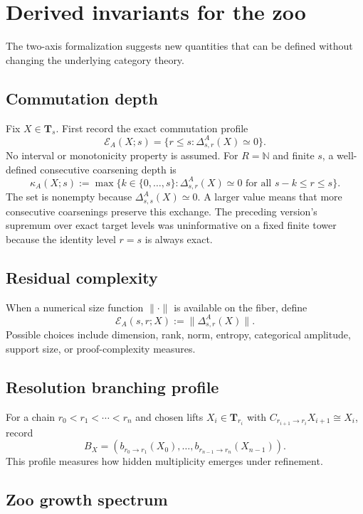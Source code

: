 \documentclass[11pt]{article}
\theoremstyle{definition}
\theoremstyle{remark}
\newcommand{\Tcat}{\mathbf T}
\begin{document}
\section{Derived invariants for the zoo}

The two-axis formalization suggests new quantities that can be defined without changing the underlying category theory.

\subsection{Commutation depth}

Fix $X\in\Tcat_s$. First record the exact commutation profile
\[
\mathcal E_A(X;s)=\{r\le s:\Delta^A_{s,r}(X)\simeq0\}.
\]
No interval or monotonicity property is assumed. For $R=\mathbb N$ and finite $s$, a well-defined consecutive coarsening depth is
\[
\kappa_A(X;s):=\max\{k\in\{0,\ldots,s\}:\Delta^A_{s,r}(X)\simeq0
\text{ for all }s-k\le r\le s\}.
\]
The set is nonempty because $\Delta^A_{s,s}(X)\simeq0$. A larger value means that more consecutive coarsenings preserve this exchange. The preceding version's supremum over exact target levels was uninformative on a fixed finite tower because the identity level $r=s$ is always exact.

\subsection{Residual complexity}

When a numerical size function $\|\cdot\|$ is available on the fiber, define
\[
\mathcal E_A(s,r;X):=\|\Delta^A_{s,r}(X)\|.
\]
Possible choices include dimension, rank, norm, entropy, categorical amplitude, support size, or proof-complexity measures.

\subsection{Resolution branching profile}

For a chain $r_0<r_1<\cdots<r_n$ and chosen lifts $X_i\in\Tcat_{r_i}$ with $C_{r_{i+1}\to r_i}X_{i+1}\cong X_i$, record
\[
B_X=(b_{r_0\to r_1}(X_0),\ldots,b_{r_{n-1}\to r_n}(X_{n-1})).
\]
This profile measures how hidden multiplicity emerges under refinement.

\subsection{Zoo growth spectrum}
\end{document}

